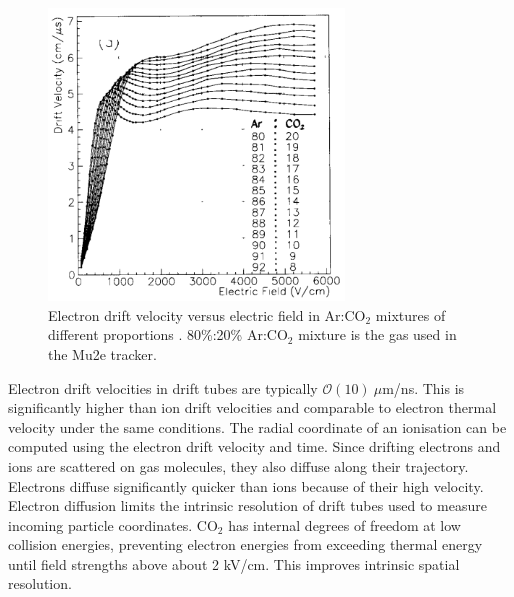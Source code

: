\begin{figure}[!h]
    \centering
    \includegraphics[width =0.7\textwidth]{figures/png/Screenshot_20240330_102206.png}
    \caption[Electron drift velocity versus electric field in Ar:CO$_2$ mixtures.]{Electron drift velocity versus electric field in Ar:CO$_2$ mixtures of different proportions \cite{ZHAO1994485}. 
    80\%:20\% Ar:CO$_2$ mixture is the gas used in the Mu2e tracker.}
    \label{fig:drift}
\end{figure}
Electron drift velocities in drift tubes are typically $\mathcal{O}(10) \ \mu$m/ns. 
This is significantly higher than ion drift velocities and comparable to electron
thermal velocity under the same conditions. 
The radial coordinate of an ionisation can be computed using the electron drift velocity and time.
Since drifting electrons and ions are scattered on gas molecules, they also diffuse along their trajectory. 
Electrons diffuse significantly quicker than ions because of their high velocity. Electron diffusion limits 
the intrinsic resolution of drift tubes used to measure incoming particle coordinates. CO$_2$ has internal 
degrees of freedom at low collision energies, preventing electron energies from exceeding thermal energy until 
field strengths above about 2 kV/cm. This improves intrinsic spatial resolution.
